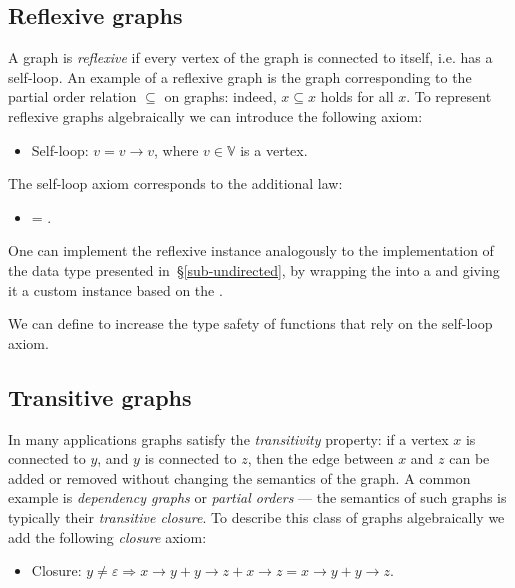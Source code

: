 \subsection{Reflexive graphs}\label{sub-reflexive}

A graph is \emph{reflexive} if every vertex of the graph is connected to itself,
i.e. has a self-loop. An example of a reflexive graph is the graph corresponding
to the partial order relation $\subseteq$ on graphs: indeed, $x \subseteq x$ holds
for all $x$. To represent reflexive graphs algebraically we can introduce the
following axiom:

\begin{itemize}
    \item Self-loop: $v = v \rightarrow v$, where $v\in \mathbb{V}$ is a vertex.
\end{itemize}

\noindent
The self-loop axiom corresponds to the additional  law:

\begin{itemize}
    \item {} = .
\end{itemize}

One can implement the reflexive  instance analogously to the
implementation of the  data type presented in~\S\ref{sub-undirected},
by wrapping the  into a  and giving it a custom 
instance based on the .

We can define
to increase the type safety of functions that rely on the self-loop axiom.

\subsection{Transitive graphs}\label{sub-transitive}

In many applications graphs satisfy the \emph{transitivity} property: if a vertex $x$ is
connected to $y$, and $y$ is connected to $z$, then the edge between $x$ and $z$ can be
added or removed without changing the semantics of the graph. A common example is
\emph{dependency graphs} or \emph{partial orders} --- the semantics of such graphs is
typically their \emph{transitive closure}.
To describe this class of graphs algebraically we add the following \emph{closure} axiom:

\begin{itemize}
    \item Closure: $y \neq \varepsilon \Rightarrow x \rightarrow y + y \rightarrow z +
    x \rightarrow z = x \rightarrow y + y \rightarrow z$.
\end{itemize}


